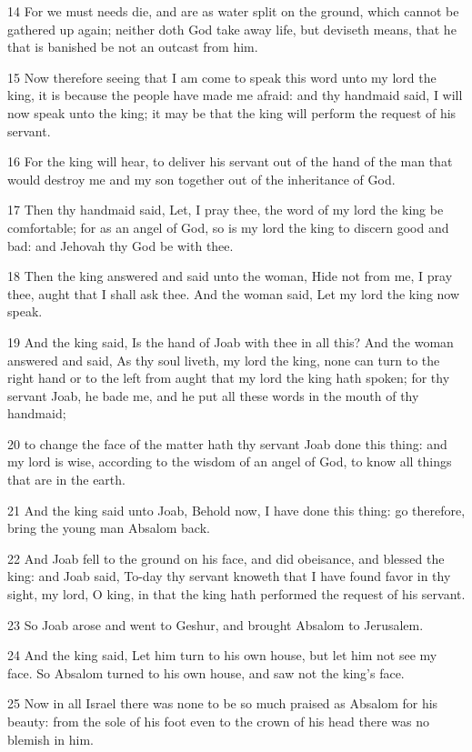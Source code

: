 \par 14 For we must needs die, and are as water split on the ground, which cannot be gathered up again; neither doth God take away life, but deviseth means, that he that is banished be not an outcast from him.
\par 15 Now therefore seeing that I am come to speak this word unto my lord the king, it is because the people have made me afraid: and thy handmaid said, I will now speak unto the king; it may be that the king will perform the request of his servant.
\par 16 For the king will hear, to deliver his servant out of the hand of the man that would destroy me and my son together out of the inheritance of God.
\par 17 Then thy handmaid said, Let, I pray thee, the word of my lord the king be comfortable; for as an angel of God, so is my lord the king to discern good and bad: and Jehovah thy God be with thee.
\par 18 Then the king answered and said unto the woman, Hide not from me, I pray thee, aught that I shall ask thee. And the woman said, Let my lord the king now speak.
\par 19 And the king said, Is the hand of Joab with thee in all this? And the woman answered and said, As thy soul liveth, my lord the king, none can turn to the right hand or to the left from aught that my lord the king hath spoken; for thy servant Joab, he bade me, and he put all these words in the mouth of thy handmaid;
\par 20 to change the face of the matter hath thy servant Joab done this thing: and my lord is wise, according to the wisdom of an angel of God, to know all things that are in the earth.
\par 21 And the king said unto Joab, Behold now, I have done this thing: go therefore, bring the young man Absalom back.
\par 22 And Joab fell to the ground on his face, and did obeisance, and blessed the king: and Joab said, To-day thy servant knoweth that I have found favor in thy sight, my lord, O king, in that the king hath performed the request of his servant.
\par 23 So Joab arose and went to Geshur, and brought Absalom to Jerusalem.
\par 24 And the king said, Let him turn to his own house, but let him not see my face. So Absalom turned to his own house, and saw not the king's face.
\par 25 Now in all Israel there was none to be so much praised as Absalom for his beauty: from the sole of his foot even to the crown of his head there was no blemish in him.
